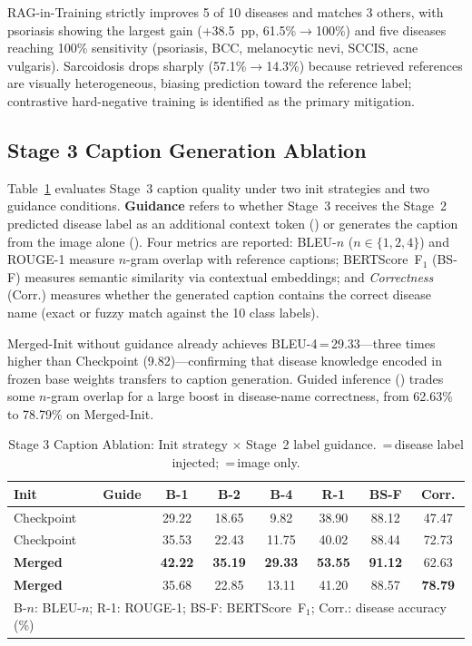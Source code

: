 \documentclass[conference,a4paper]{IEEEtran}
\newcommand{\cmark}{\ding{51}}%
\newcommand{\xmark}{\ding{55}}%
\begin{document}
RAG-in-Training strictly improves 5 of 10 diseases and matches 3 others,
with psoriasis showing the largest gain (+38.5~pp, 61.5\%$\rightarrow$100\%)
and five diseases reaching 100\% sensitivity (psoriasis, BCC, melanocytic
nevi, SCCIS, acne vulgaris).  Sarcoidosis drops sharply
(57.1\%$\rightarrow$14.3\%) because retrieved references are visually
heterogeneous, biasing prediction toward the reference label; contrastive
hard-negative training is identified as the primary mitigation.

\subsection{Stage 3 Caption Generation Ablation}

Table~\ref{tab:caption} evaluates Stage~3 caption quality under two
init strategies and two guidance conditions.
\textbf{Guidance} refers to whether Stage~3 receives the Stage~2 predicted
disease label as an additional context token (\cmark) or generates the
caption from the image alone (\xmark).
Four metrics are reported: BLEU-$n$ ($n\in\{1,2,4\}$) and ROUGE-1 measure
$n$-gram overlap with reference captions; BERTScore~F$_1$ (BS-F)
measures semantic similarity via contextual embeddings; and
\textit{Correctness} (Corr.) measures whether the generated caption
contains the correct disease name (exact or fuzzy match against the
10 class labels).

Merged-Init without guidance already achieves BLEU-4\,=\,29.33---three
times higher than Checkpoint (9.82)---confirming that disease knowledge
encoded in frozen base weights transfers to caption generation.
Guided inference (\cmark) trades some $n$-gram overlap for a large boost
in disease-name correctness, from 62.63\% to 78.79\% on Merged-Init.

\begin{table}[t]
\caption{Stage 3 Caption Ablation: Init strategy $\times$ Stage~2 label guidance.
         \cmark\,=\,disease label injected; \xmark\,=\,image only.}
\label{tab:caption}
\begin{center}
\small
\setlength{\tabcolsep}{2.5pt}
\begin{tabular}{l c c c c c c c}
\toprule
\textbf{Init} & \textbf{Guide} &
  \textbf{B-1} & \textbf{B-2} & \textbf{B-4} &
  \textbf{R-1} & \textbf{BS-F} & \textbf{Corr.} \\
\midrule
Checkpoint   & \xmark       & 29.22 & 18.65 & 9.82  & 38.90 & 88.12 & 47.47 \\
Checkpoint   & \cmark       & 35.53 & 22.43 & 11.75 & 40.02 & 88.44 & 72.73 \\
\midrule
\textbf{Merged} & \xmark    & \textbf{42.22} & \textbf{35.19} & \textbf{29.33} & \textbf{53.55} & \textbf{91.12} & 62.63 \\
\textbf{Merged} & \cmark    & 35.68 & 22.85 & 13.11 & 41.20 & 88.57 & \textbf{78.79} \\
\bottomrule
\multicolumn{8}{l}{\scriptsize B-$n$: BLEU-$n$; R-1: ROUGE-1; BS-F: BERTScore~F$_1$; Corr.: disease accuracy (\%)}
\end{tabular}
\end{center}
\end{table}
\end{document}
